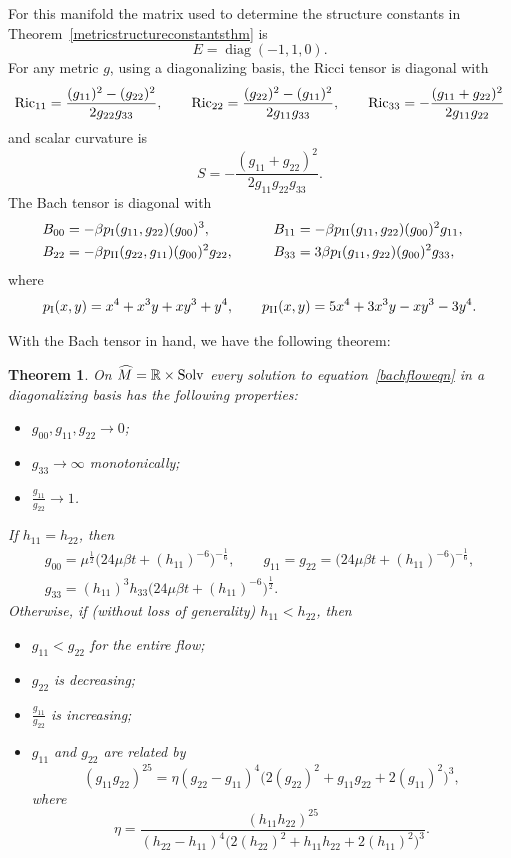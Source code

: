\documentclass[pdftex]{sigma}
\numberwithin{equation}{section}
\newtheorem{Theorem}{Theorem}[section]
\newcommand{\diag}{\operatorname{diag}} %
\begin{document}
For this manifold the matrix used to determine the structure constants in Theorem~\ref{metricstructureconstantsthm} is
\[
E = \diag(-1, 1, 0).
\]
For any metric $g$, using a diagonalizing basis, the Ricci tensor is diagonal with
\begin{gather*}
{\rm Ric}_{11} = \frac{(g_{11})^2 - (g_{22})^2}{2 g_{22} g_{33}},\qquad
{\rm Ric}_{22} = \frac{(g_{22})^2 - (g_{11})^2}{2 g_{11} g_{33}},\qquad
{\rm Ric}_{33} = - \frac{(g_{11} + g_{22})^2}{2 g_{11} g_{22}}
\end{gather*}
and scalar curvature is
\[
S = -\frac{(g_{11} + g_{22})^2}{2 g_{11} g_{22} g_{33}}.
\]
The Bach tensor is diagonal with
\begin{alignat*}{3}
& B_{00} = -\beta p_{\rm I}(g_{11}, g_{22}) (g_{00})^3, \qquad &&
B_{11} = -\beta p_{\rm II}(g_{11}, g_{22}) (g_{00})^2 g_{11}, & \\
& B_{22} = -\beta p_{\rm II}(g_{22}, g_{11}) (g_{00})^2 g_{22}, \qquad&&
B_{33} = 3\beta p_{\rm I}(g_{11}, g_{22}) (g_{00})^2 g_{33},&
\end{alignat*}
where
\begin{gather*}
p_{\rm I}(x, y) = x^4 + x^3y + xy^3 + y^4, \qquad
p_{\rm II}(x, y) = 5x^4 + 3x^3y - xy^3 - 3y^4.
\end{gather*}

With the Bach tensor in hand, we have the following theorem:

\begin{Theorem} \label{solvthm} On $\widehat{M} = \mathbb{R} \times {\rm Solv}$ every solution to equation~\eqref{bachfloweqn} in a diagonalizing basis has the following properties:
\begin{itemize}\itemsep=0pt
\item $g_{00}, g_{11}, g_{22} \rightarrow 0$;
\item $g_{33} \rightarrow \infty$ monotonically;
\item $\frac{g_{11}}{g_{22}} \rightarrow 1$.
\end{itemize}
If $h_{11} = h_{22}$, then
\begin{gather*}
g_{00} = \mu^{\frac{1}{2}} \bigl(24 \mu \beta t + (h_{11})^{-6} \bigr)^{-\frac{1}{6}},\qquad
g_{11} = g_{22} = \bigl(24 \mu \beta t + (h_{11})^{-6} \bigr)^{-\frac{1}{6}}, \\
g_{33} = (h_{11})^3 h_{33} \bigl(24 \mu \beta t + (h_{11})^{-6} \bigr)^{\frac{1}{2}}.
\end{gather*}
Otherwise, if (without loss of generality) $h_{11} < h_{22}$, then
\begin{itemize}\itemsep=0pt
\item $g_{11} < g_{22}$ for the entire flow;
\item $g_{22}$ is decreasing;
\item $\frac{g_{11}}{g_{22}}$ is increasing;
\item $g_{11}$ and $g_{22}$ are related by
\[
(g_{11} g_{22})^{25} = \eta (g_{22}-g_{11})^{4} \big(2(g_{22})^2 + g_{11} g_{22} + 2(g_{11})^2\big)^{3},
\]
where
\[
\eta = \frac{(h_{11} h_{22})^{25}}{(h_{22}-h_{11})^{4}
				\big(2(h_{22})^2 + h_{11} h_{22} + 2(h_{11})^2\big)^{3}}.
\]
\end{itemize}
\end{Theorem}
\end{document}
